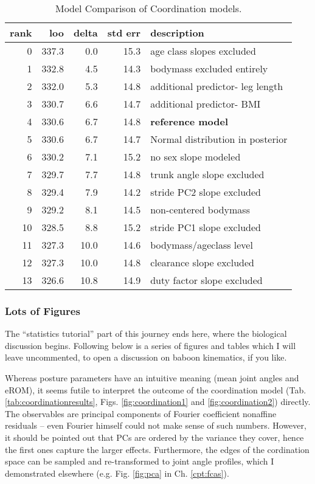 \begin{table}[p]
\caption{\label{tab:coordinationmodelcomparison}Model Comparison of Coordination models.}
\centering
\begin{tabular}{rrrrl}
\textbf{rank} & \textbf{loo} & \textbf{delta} & \textbf{std err} & \textbf{description}\\[0pt]
\hline
0 & 337.3 & 0.0 & 15.3 & age class slopes excluded\\[0pt]
1 & 332.8 & 4.5 & 14.3 & bodymass excluded entirely\\[0pt]
2 & 332.0 & 5.3 & 14.8 & additional predictor- leg length\\[0pt]
3 & 330.7 & 6.6 & 14.7 & additional predictor- BMI\\[0pt]
4 & 330.6 & 6.7 & 14.8 & \textbf{reference model}\\[0pt]
5 & 330.6 & 6.7 & 14.7 & Normal distribution in posterior\\[0pt]
6 & 330.2 & 7.1 & 15.2 & no sex slope modeled\\[0pt]
7 & 329.7 & 7.7 & 14.8 & trunk angle slope excluded\\[0pt]
8 & 329.4 & 7.9 & 14.2 & stride PC2 slope excluded\\[0pt]
9 & 329.2 & 8.1 & 14.5 & non-centered bodymass\\[0pt]
10 & 328.5 & 8.8 & 15.2 & stride PC1 slope excluded\\[0pt]
11 & 327.3 & 10.0 & 14.6 & bodymass/ageclass level\\[0pt]
12 & 327.3 & 10.0 & 14.8 & clearance slope excluded\\[0pt]
13 & 326.6 & 10.8 & 14.9 & duty factor slope excluded\\[0pt]
\end{tabular}
\end{table}


\clearpage
\subsubsection{Lots of Figures}
\label{sec:org00d6433}
The ``statistics tutorial'' part of this journey ends here, where the biological discussion begins.
Following below is a series of figures and tables which I will leave uncommented, to open a discussion on baboon kinematics, if you like.

Whereas posture parameters have an intuitive meaning (mean joint angles and eROM), it seems futile to interpret the outcome of the coordination model (Tab. \ref{tab:coordinationresults}, Figs. \ref{fig:coordination1} and \ref{fig:coordination2}) directly.
The observables are principal components of Fourier coefficient nonaffine residuals -- even Fourier himself could not make sense of such numbers.
However, it should be pointed out that PCs are ordered by the variance they cover, hence the first ones capture the larger effects.
Furthermore, the edges of the cordination space can be sampled and re-transformed to joint angle profiles, which I demonstrated elsewhere (e.g. Fig. \ref{fig:pca} in Ch. \ref{cpt:fcas}).


